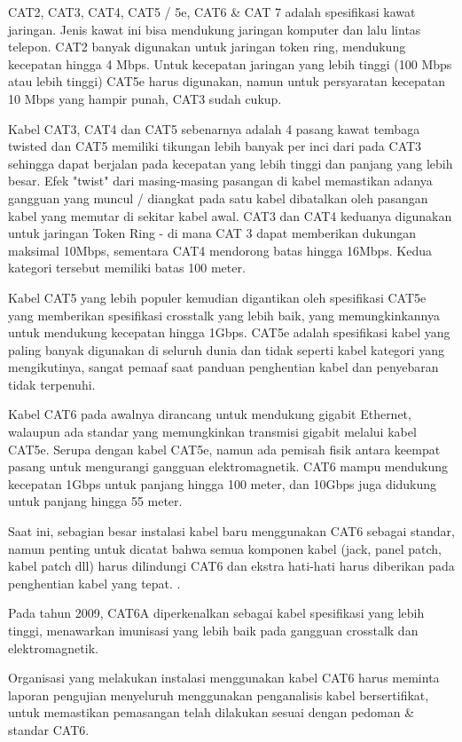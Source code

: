 CAT2, CAT3, CAT4, CAT5 / 5e, CAT6 & CAT 7 adalah spesifikasi kawat jaringan. Jenis kawat ini bisa mendukung jaringan komputer dan lalu lintas telepon. CAT2 banyak digunakan untuk jaringan token ring, mendukung kecepatan hingga 4 Mbps. Untuk kecepatan jaringan yang lebih tinggi (100 Mbps atau lebih tinggi) CAT5e harus digunakan, namun untuk persyaratan kecepatan 10 Mbps yang hampir punah, CAT3 sudah cukup.

Kabel CAT3, CAT4 dan CAT5 sebenarnya adalah 4 pasang kawat tembaga twisted dan CAT5 memiliki tikungan lebih banyak per inci dari pada CAT3 sehingga dapat berjalan pada kecepatan yang lebih tinggi dan panjang yang lebih besar. Efek "twist" dari masing-masing pasangan di kabel memastikan adanya gangguan yang muncul / diangkat pada satu kabel dibatalkan oleh pasangan kabel yang memutar di sekitar kabel awal. CAT3 dan CAT4 keduanya digunakan untuk jaringan Token Ring - di mana CAT 3 dapat memberikan dukungan maksimal 10Mbps, sementara CAT4 mendorong batas hingga 16Mbps. Kedua kategori tersebut memiliki batas 100 meter.

Kabel CAT5 yang lebih populer kemudian digantikan oleh spesifikasi CAT5e yang memberikan spesifikasi crosstalk yang lebih baik, yang memungkinkannya untuk mendukung kecepatan hingga 1Gbps. CAT5e adalah spesifikasi kabel yang paling banyak digunakan di seluruh dunia dan tidak seperti kabel kategori yang mengikutinya, sangat pemaaf saat panduan penghentian kabel dan penyebaran tidak terpenuhi.

Kabel CAT6 pada awalnya dirancang untuk mendukung gigabit Ethernet, walaupun ada standar yang memungkinkan transmisi gigabit melalui kabel CAT5e. Serupa dengan kabel CAT5e, namun ada pemisah fisik antara keempat pasang untuk mengurangi gangguan elektromagnetik. CAT6 mampu mendukung kecepatan 1Gbps untuk panjang hingga 100 meter, dan 10Gbps juga didukung untuk panjang hingga 55 meter.

Saat ini, sebagian besar instalasi kabel baru menggunakan CAT6 sebagai standar, namun penting untuk dicatat bahwa semua komponen kabel (jack, panel patch, kabel patch dll) harus dilindungi CAT6 dan ekstra hati-hati harus diberikan pada penghentian kabel yang tepat. .

Pada tahun 2009, CAT6A diperkenalkan sebagai kabel spesifikasi yang lebih tinggi, menawarkan imunisasi yang lebih baik pada gangguan crosstalk dan elektromagnetik.

Organisasi yang melakukan instalasi menggunakan kabel CAT6 harus meminta laporan pengujian menyeluruh menggunakan penganalisis kabel bersertifikat, untuk memastikan pemasangan telah dilakukan sesuai dengan pedoman & standar CAT6.

